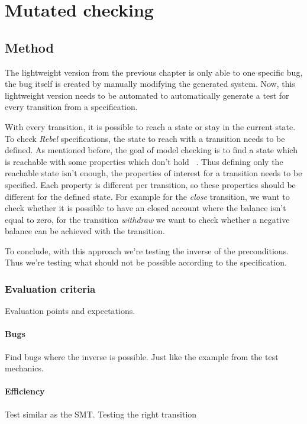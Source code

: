 \chapter{Mutated checking}\label{sec:ch4}


\section{Method}

The lightweight version from the previous chapter is only able to one specific
bug, the bug itself is created by manually modifying the generated system. Now,
this lightweight version needs to be automated to automatically generate a test
for every transition from a specification.

With every transition, it is possible to reach a state or stay in the current
state. To check \textit{Rebel} specifications, the state to reach with a transition needs
to be defined. As mentioned before, the goal of model checking is to find a
state which is reachable with some properties which don't hold
~\cite[p.5]{stoel_storm_vinju_bosman_2016}. Thus defining only the reachable
state isn't enough, the properties of interest for a transition needs to be
specified. Each property is different per transition, so these properties should
be different for the defined state. For example for the \textit{close}
transition, we want to check whether it is possible to have an closed account
where the balance isn't equal to zero, for the transition \textit{withdraw} we
want to check whether a negative balance can be achieved with the transition.

To conclude, with this approach we're testing the inverse of the preconditions. Thus we're testing
what should not be possible according to the specification.

\subsection{Evaluation criteria}
Evaluation points and expectations.

\subsubsection{Bugs}
Find bugs where the inverse is possible. Just like the example from the test
mechanics.

\subsubsection{Efficiency}
Test similar as the SMT. Testing the right transition

